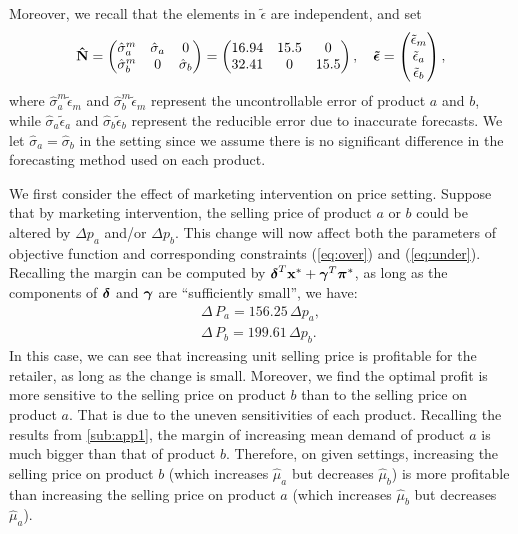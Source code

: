 \documentclass[a4paper,11pt]{article}
\begin{document}
Moreover, we recall that the elements in \mbox{\boldmath$\tilde{\epsilon}$} are independent, and set
\[
\mathbf{\hat{N}} = 
\begin{pmatrix}
\hat{\sigma}_a^m&\hat{\sigma}_a&0\\
\hat{\sigma}_b^m&0&\hat{\sigma}_b\\
\end{pmatrix} =
\begin{pmatrix}
16.94&15.5&0\\
32.41&0&15.5\\
\end{pmatrix}
,\quad \mbox{\boldmath$\tilde{\epsilon}$} = 
\begin{pmatrix}
\tilde{\epsilon}_m\\
\tilde{\epsilon}_a\\
\tilde{\epsilon}_b
\end{pmatrix},
\]
where $\hat{\sigma}_a^m \tilde{\epsilon}_m$ and $\hat{\sigma}_b^m \tilde{\epsilon}_m$ represent the uncontrollable error of product $a$ and $b$, while $\hat{\sigma}_a \tilde{\epsilon}_a$ and $\hat{\sigma}_b \tilde{\epsilon}_b$
represent the reducible error due to inaccurate forecasts. We let $\hat{\sigma}_a = \hat{\sigma}_b$ in the setting since we assume there is no significant difference in the forecasting method used on each product.

We first consider the effect of marketing intervention on price setting. Suppose that by marketing intervention, the selling price of product $a$ or $b$ could be altered by $\Delta p_a$ and/or $\Delta p_b$. This change will now affect both the parameters of objective function and corresponding constraints (\ref{eq:over}) and (\ref{eq:under}). Recalling the margin can be computed by $\mbox{\boldmath$\delta$}^T \mathbf{x}^* + \mbox{\boldmath$\gamma$}^T \mbox{\boldmath$\pi$}^*$,
as long as the components of $\mbox{\boldmath$\delta$}$ and $\mbox{\boldmath$\gamma$}$
are ``sufficiently small”, we have: 
\[
\begin{aligned}
    \Delta \, P_a = 156.25 \, \Delta p_a,\\
    \Delta \, P_b = 199.61 \, \Delta p_b.
\end{aligned}
\]
In this case, we can see that increasing unit selling price is profitable for the retailer, as long as the change is small. Moreover, we find the optimal profit is more sensitive to the selling price on product $b$ than to the selling price on product $a$. That is due to the uneven sensitivities of each product. Recalling the results from \ref{sub:app1}, the margin of increasing mean demand of product $a$ is much bigger than that of product $b$. Therefore, on given settings, increasing the selling price on product $b$ (which increases $\hat{\mu}_a$ but decreases $\hat{\mu}_b$) is more profitable than increasing the selling price on product $a$ (which increases $\hat{\mu}_b$ but decreases $\hat{\mu}_a$).
\end{document}
